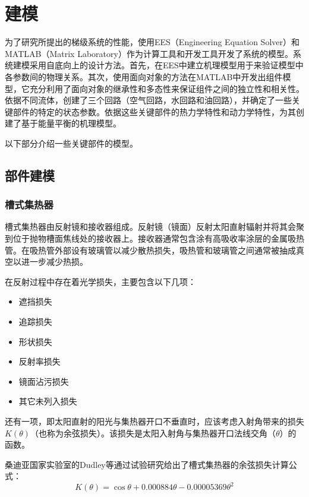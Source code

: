 \chapter{建模}
\label{cha:Modeling}

为了研究所提出的梯级系统的性能，使用EES（Engineering Equation Solver）和MATLAB（Matrix Laboratory）作为计算工具和开发工具开发了系统的模型。系统建模采用自底向上的设计方法。首先，在EES中建立机理模型用于来验证模型中各参数间的物理关系。其次，使用面向对象的方法在MATLAB中开发出组件模型，它充分利用了面向对象的继承性和多态性来保证组件之间的独立性和相关性。
依据不同流体，创建了三个回路（空气回路，水回路和油回路），并确定了一些关键部件的特定的状态参数。依据这些关键部件的热力学特性和动力学特性，为其创建了基于能量平衡的机理模型。

以下部分介绍一些关键部件的模型。
\section{部件建模}
\subsection{槽式集热器}
\label{sec:ptc}

槽式集热器由反射镜和接收器组成。反射镜（镜面）反射太阳直射辐射并将其会聚到位于抛物槽面焦线处的接收器上。接收器通常包含涂有高吸收率涂层的金属吸热管。在吸热管外部设有玻璃管以减少散热损失，吸热管和玻璃管之间通常被抽成真空以进一步减少热损。

在反射过程中存在着光学损失，主要包含以下几项\cite{Price2002}：

\begin{itemize}
  \item 遮挡损失
  \item 追踪损失
  \item 形状损失
  \item 反射率损失
  \item 镜面沾污损失
  \item 其它未列入损失
\end{itemize}

还有一项，即太阳直射的阳光与集热器开口不垂直时，应该考虑入射角带来的损失$K(\theta)$（也称为余弦损失）。该损失是太阳入射角与集热器开口法线交角（$\theta$）的函数。

桑迪亚国家实验室的Dudley等\cite{Dudley1994}通过试验研究给出了槽式集热器的余弦损失计算公式：
\begin{equation}
  K(\theta) = \cos\theta+0.000884\theta-0.00005369\theta^2
\end{equation}

